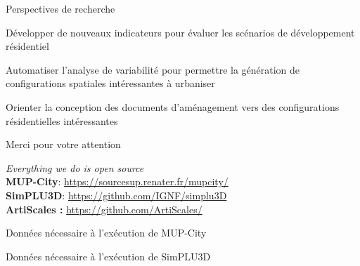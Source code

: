 \documentclass[xcolor=table]{beamer}
\begin{document}
\begin{frame}{Perspectives de recherche}
	\begin{block}{}
	Développer de nouveaux indicateurs pour évaluer les scénarios de développement résidentiel
	\end{block}
	\begin{block}{}
	Automatiser l'analyse de variabilité pour permettre la génération de configurations spatiales intéressantes à urbaniser
	\end{block}
	\begin{block}{}
		Orienter la conception des documents d'aménagement vers des configurations résidentielles intéressantes
	\end{block}
\end{frame}



\begin{frame}[standout]
	\centering
	\begin{block}{}	
		\centering	
		Merci pour votre attention
	\end{block}
	\begin{block}{}
		\centering
		\textit{Everything we do is open source}\\
		\large
		\textbf{MUP-City}: \url{https://sourcesup.renater.fr/mupcity/} \\
		\textbf{SimPLU3D}: \url{https://github.com/IGNF/simplu3D}\\
		\textbf{ArtiScales :} \url{https://github.com/ArtiScales/}
	\end{block}
\end{frame}

\begin{frame}{Données nécessaire à l'exécution de MUP-City}
\end{frame}
\begin{frame}{Données nécessaire à l'exécution de SimPLU3D}
\end{frame}
\end{document}
